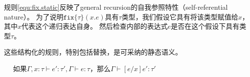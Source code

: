 规则\ref{equ:fix.static}反映了\gls{general recursion}的自我参照特性（self-referential nature）。
为了说明\(\mathtt{fix}\{\tau\}(x.e)\)具有\(\tau\)类型，我们假设它具有将该类型赋值给\(x\)，其中\(x\)代表这个递归表达自身。
然后检查内部的表达式\(e\)是否在这个假设下具有类型\(\tau\)。

这些结构化的规则，特别包括替换，是可采纳的静态语义。

\begin{lemma}　
	如果\(\Gamma, x: \tau \vdash e': \tau', \Gamma \vdash e: \tau\)，那么\(\Gamma \vdash [e/x]e': \tau'\)
\end{lemma}

